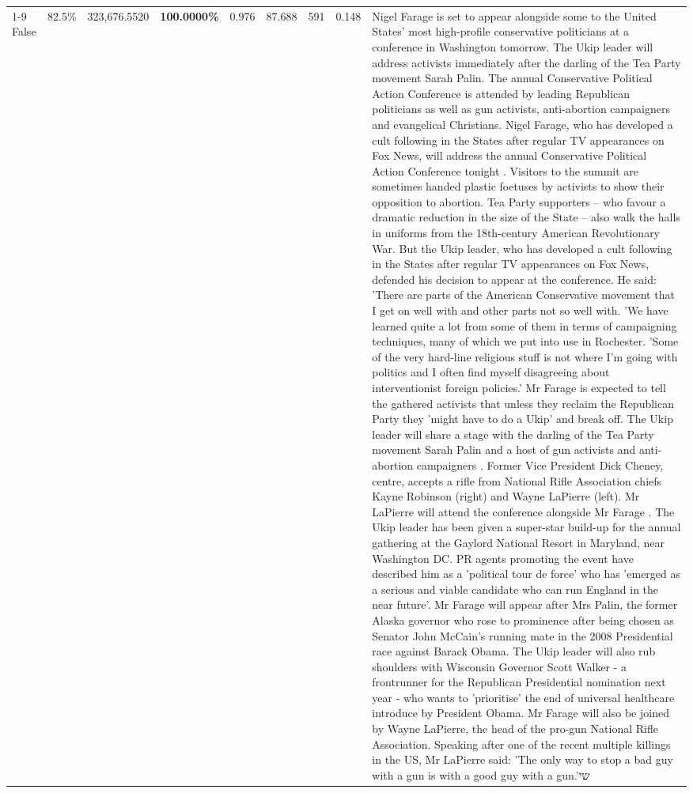 \begin{table}[H]
\begin{tabular}{lllrlllll}
\cline{1-9} \cline{2-9}
False & 82.5\% & 323,676.5520 & \bfseries \color{red} 100.0000\% & 0.976 & 87.688 & 591 & 0.148 & Nigel Farage is set to appear alongside some to the United States' most high-profile conservative politicians at a conference in Washington tomorrow. The Ukip leader will address activists immediately after the darling of the Tea Party movement Sarah Palin. The annual Conservative Political Action Conference is attended by leading Republican politicians as well as gun activists, anti-abortion campaigners and evangelical Christians. Nigel Farage, who has developed a cult following in the States after regular TV appearances on Fox News, will address the annual Conservative Political Action Conference tonight . Visitors to the summit are sometimes handed plastic foetuses by activists to show their opposition to abortion. Tea Party supporters – who favour a dramatic reduction in the size of the State – also walk the halls in uniforms from the 18th-century American Revolutionary War. But the Ukip leader, who has developed a cult following in the States after regular TV appearances on Fox News, defended his decision to appear at the conference. He said: 'There are parts of the American Conservative movement that I get on well with and other parts not so well with. 'We have learned quite a lot from some of them in terms of campaigning techniques, many of which we put into use in Rochester. 'Some of the very hard-line religious stuff is not where I'm going with politics and I often find myself disagreeing about interventionist foreign policies.' Mr Farage is expected to tell the gathered activists that unless they reclaim the Republican Party they 'might have to do a Ukip' and break off. The Ukip leader will share a stage with the darling of the Tea Party movement Sarah Palin and a host of gun activists and anti-abortion campaigners . Former Vice President Dick Cheney, centre, accepts a rifle from National Rifle Association chiefs Kayne Robinson (right) and Wayne LaPierre (left). Mr LaPierre will attend the conference alongside Mr Farage . The Ukip leader has been given a super-star build-up for the annual gathering at the Gaylord National Resort in Maryland, near Washington DC. PR agents promoting the event have described him as a 'political tour de force' who has 'emerged as a serious and viable candidate who can run England in the near future'. Mr Farage will appear after Mrs Palin, the former Alaska governor who rose to prominence after being chosen as Senator John McCain's running mate in the 2008 Presidential race against Barack Obama. The Ukip leader will also rub shoulders with Wisconsin Governor Scott Walker - a frontrunner for the Republican Presidential nomination next year - who wants to 'prioritise' the end of universal healthcare introduce by President Obama. Mr Farage will also be joined by Wayne LaPierre, the head of the pro-gun National Rifle Association. Speaking after one of the recent multiple killings in the US, Mr LaPierre said: 'The only way to stop a bad guy with a gun is with a good guy with a gun.'שי \\

\end{tabular}
\end{table}
